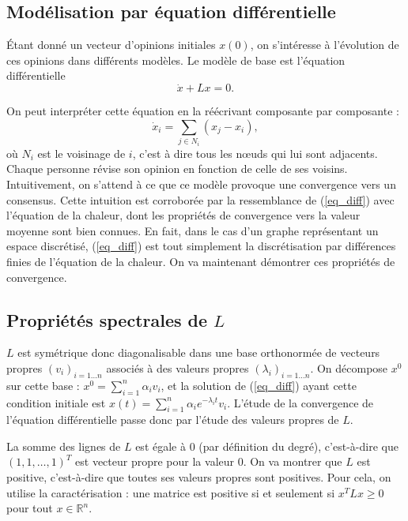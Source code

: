 \documentclass[12pt]{article}
\newcommand{\R}{\mathbb{R}}
\begin{document}
\subsection{Modélisation par équation différentielle}
Étant donné un vecteur d'opinions initiales $x(0)$, on
s'intéresse à l'évolution de ces opinions dans différents
modèles. Le modèle de base est l'équation différentielle
\begin{equation}
 \label{eq_diff}
 \dot x + L x = 0.
\end{equation}

On peut interpréter cette équation en la réécrivant composante par composante :
\begin{equation}
 \label{eq_diff_scal}
 \dot {x}_i = \sum_{j \in N_i} (x_j - x_i),
\end{equation}
où $N_i$ est le voisinage de $i$, c'est à dire tous les n\oe uds qui lui
sont adjacents. Chaque personne révise son opinion en fonction de
celle de ses voisins. Intuitivement, on s'attend à ce que ce modèle
provoque une convergence vers un consensus. Cette intuition est
corroborée par la ressemblance de (\ref{eq_diff}) avec l'équation de
la chaleur, dont les propriétés de convergence vers la valeur moyenne
sont bien connues. En fait, dans le cas d'un graphe représentant un
espace discrétisé, (\ref{eq_diff}) est tout simplement la
discrétisation par différences finies de l'équation de la chaleur. On
va maintenant démontrer ces propriétés de convergence.

\subsection{Propriétés spectrales de $L$}
\label{props_spectrales_L}
$L$ est symétrique donc diagonalisable dans une base orthonormée de
vecteurs propres $(v_i)_{i=1\dots n}$ associés à des valeurs propres
$(\lambda_i)_{i=1 \dots n}$. On décompose $x^0$ sur cette base : $x^0
= \sum_{i=1}^n \alpha_i v_i$, et la solution de (\ref{eq_diff}) ayant
cette condition initiale est $x(t) = \sum_{i=1}^n \alpha_i e^{-
 \lambda_i t} v_i$. L'étude de la convergence de l'équation
différentielle passe donc par l'étude des valeurs propres de $L$.

La somme des lignes de $L$ est égale à $0$ (par définition du degré),
c'est-à-dire que $(1, 1, \dots, 1)^T$ est vecteur propre pour la valeur
$0$. On va montrer que $L$ est positive, c'est-à-dire que toutes ses
valeurs propres sont positives. Pour cela, on utilise la
caractérisation : une matrice est positive si et seulement si $x^T L x \geq 0$ pour
tout $x \in \R^n$.
\end{document}
